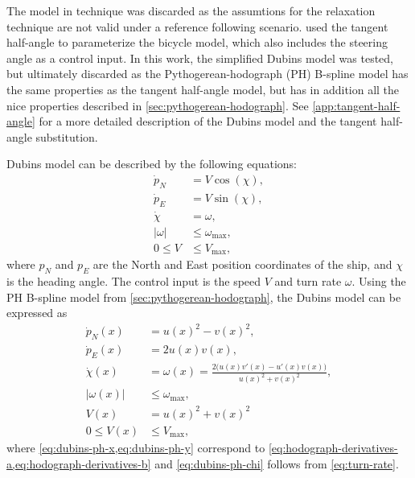 The model in \cite{Wang2020} technique was discarded as the assumtions for the relaxation technique are not valid under a reference following scenario. \cite{mercy2017spline} used the tangent half-angle to parameterize the bicycle model, which also includes the steering angle as a control input. In this work, the simplified Dubins model was tested, but ultimately discarded as the Pythogerean-hodograph (PH) B-spline model has the same properties as the tangent half-angle model, but has in addition all the nice properties described in \cref{sec:pythogerean-hodograph}. See \cref{app:tangent-half-angle} for a more detailed description of the Dubins model and the tangent half-angle substitution.

Dubins model can be described by the following equations:
\begin{subequations}\label{eq:dubins-model}
    \begin{align}
        \dot p_N &= V \cos(\chi),       \label{eq:dubins-x} \\
        \dot p_E &= V \sin(\chi),       \label{eq:dubins-y} \\
        \dot \chi &= \omega,          \label{eq:dubins-chi} \\
        |\omega| &\leq \omega_{\max}, \label{eq:dubins-omega} \\
        0 \leq V &\leq V_{\max},      \label{eq:dubins-V} 
    \end{align}
\end{subequations}
where $p_N$ and $p_E$ are the North and East position coordinates of the ship, and $\chi$ is the heading angle. The control input is the speed $V$ and turn rate $\omega$. Using the PH B-spline model from \cref{sec:pythogerean-hodograph}, the Dubins model can be expressed as
\begin{subequations}\label{eq:dubins-model-ph}
    \begin{align}
        \dot p_N(x) &= u(x)^2 - v(x)^2, \label{eq:dubins-ph-x} \\
        \dot p_E(x) &= 2u(x)v(x),       \label{eq:dubins-ph-y} \\
        \dot \chi(x) &= \omega(x) = \frac{2\big(u(x)v'(x) - u'(x)v(x)\big)}{u(x)^2 + v(x)^2},  \label{eq:dubins-ph-chi} \\
        |\omega(x)| &\leq \omega_{\max},  \\
        V(x) &= u(x)^2 + v(x)^2 \\
        0 \leq V(x) &\leq V_{\max}, 
    \end{align}
\end{subequations}
where \cref{eq:dubins-ph-x,eq:dubins-ph-y} correspond to \cref{eq:hodograph-derivatives-a,eq:hodograph-derivatives-b} and \cref{eq:dubins-ph-chi} follows from \cref{eq:turn-rate}.

